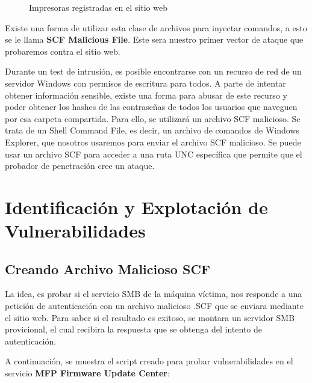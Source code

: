 \documentclass[a4paper]{article} %
\begin{document}
	\begin{figure}[h]
		\centering
		\setlength{\fboxrule}{0.8pt}
		\caption{Impresoras registradas en el sitio web}
	\end{figure}

	Existe una forma de utilizar esta clase de archivos para inyectar comandos, a esto se le llama \textbf{SCF Malicious File}. Este sera nuestro primer vector de ataque que probaremos contra el sitio web.

	\begin{definicion}
		Durante un test de intrusión, es posible encontrarse con un recurso de red de un servidor Windows con permisos de escritura para todos. A parte de intentar obtener información sensible, existe una forma para abusar de este recurso y poder obtener los hashes de las contraseñas de todos los usuarios que naveguen por esa carpeta compartida. Para ello, se utilizará un archivo SCF malicioso. Se trata de un Shell Command File, es decir, un archivo de comandos de Windows Explorer, que nosotros usaremos para enviar el archivo SCF malicioso. Se puede usar un archivo SCF para acceder a una ruta UNC específica que permite que el probador de penetración cree un ataque.
	\end{definicion}

	\clearpage


        \section{Identificación y Explotación de Vulnerabilidades}

	\subsection{Creando Archivo Malicioso SCF}

	La idea, es probar si el servicio SMB de la máquina víctima, nos responde a una petición de autenticación con un archivo malicioso .SCF que se enviara mediante el sitio web. Para saber si el resultado es exitoso, se montara un servidor SMB provicional, el cual recibira la respuesta que se obtenga del intento de autenticación.

	A continuación, se muestra el script creado para probar vulnerabilidades en el servicio \textbf{MFP Firmware Update Center}:
\end{document}
